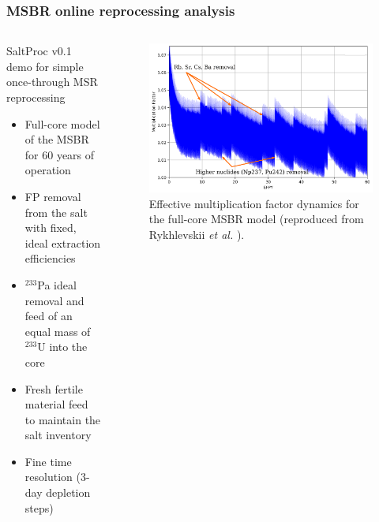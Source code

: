 \begin{frame}
\frametitle{MSBR online reprocessing analysis}

\begin{columns}
	\column[t]{4.3cm}
	\begin{block}{SaltProc v0.1 demo for simple once-through \gls{MSR} 
	reprocessing}
		\fontsize{7}{9}\selectfont
		\begin{itemize}
			\item Full-core model of the \gls{MSBR} for 60 years of operation
			\item FP removal from the salt with fixed, ideal extraction 
			efficiencies 
			\item $^{233}$Pa ideal removal and feed of an equal mass of 
			$^{233}$U into the core
			\item Fresh fertile material feed to maintain the salt inventory
			\item Fine time resolution (3-day depletion steps)
		\end{itemize}
	\end{block}    	
	
	\column[t]{8cm}
		\begin{figure}[ht!] 
		\centering
			\includegraphics[width=\textwidth]{../figures/keff_msbr.png}
			\caption{Effective multiplication factor dynamics for the 
			full-core \gls{MSBR} model (reproduced from  
			Rykhlevskii \emph{et al.} \cite{rykhlevskii_modeling_2019}).}
		\end{figure}
	
\end{columns}
\end{frame}



